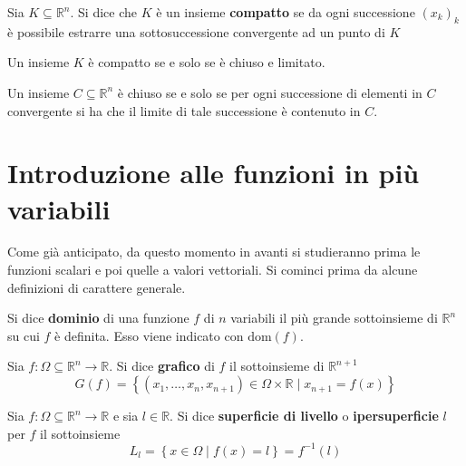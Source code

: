 \begin{definition}
    Sia $K \subseteq \mathbb{R}^n$. Si dice che $K$ è un insieme \textbf{compatto} se da ogni successione $(x_k)_k$ è possibile estrarre una sottosuccessione convergente ad un punto di $K$
\end{definition}
\begin{theorem} \label{Teo: Heine Borel}
    Un insieme $K$ è compatto se e solo se è chiuso e limitato.
\end{theorem}
    \begin{oss}
        Un insieme $C \subseteq \mathbb{R}^n$ è chiuso se e solo se per ogni successione di elementi in $C$ convergente si ha che il limite di tale successione è contenuto in $C$.
    \end{oss}


\section{Introduzione alle funzioni in più variabili}
Come già anticipato, da questo momento in avanti si studieranno prima le funzioni scalari e poi quelle a valori vettoriali.
Si cominci prima da alcune definizioni di carattere generale. 
\begin{definition}
    Si dice \textbf{dominio} di una funzione $f$ di $n$ variabili il più grande sottoinsieme di $\mathbb{R}^n$ su cui $f$ è definita. Esso viene indicato con $\text{dom}(f)$.
\end{definition}
\begin{definition}
    Sia $f: \Omega \subseteq \mathbb{R}^n \to \mathbb{R}$. Si dice \textbf{grafico} di $f$ il sottoinsieme di $\mathbb{R}^{n+1}$
    \begin{equation}
        G(f)= \left\{(x_1, \dots, x_n, x_{n+1}) \in \Omega \times \mathbb{R} \mid x_{n+1}=f(x)\right\}
    \end{equation}
\end{definition}
\begin{definition}
    Sia $f:\Omega \subseteq \mathbb{R}^n \to \mathbb{R}$ e sia $l \in \mathbb{R}$. Si dice \textbf{superficie di livello} o \textbf{ipersuperficie} $l$ per $f$ il sottoinsieme
    \begin{equation}
        L_l=\left\{x \in \Omega \mid f(x)=l\right\}=f^{-1}(l)
    \end{equation}
\end{definition}

